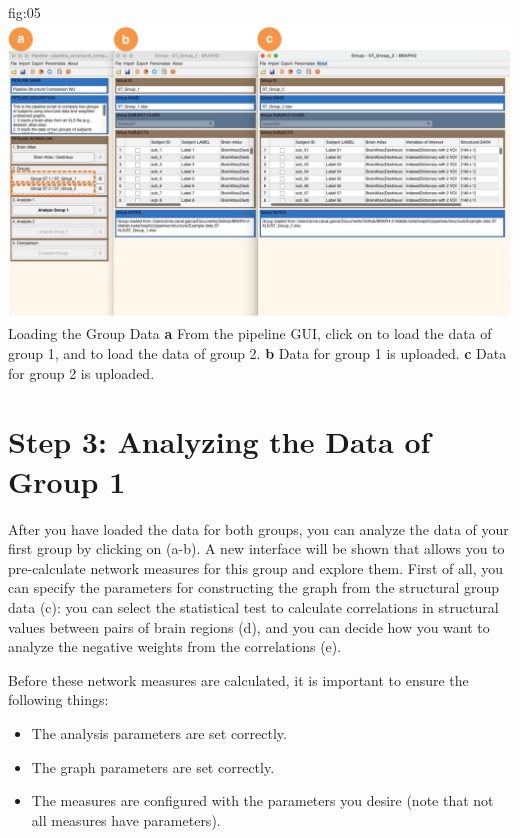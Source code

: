 \documentclass[justified]{tufte-handout}
\begin{document}
	{fig:05}
	{\includegraphics{fig05.jpg}}
	{Loading the Group Data}
	{
	{\bf a} From the pipeline GUI, click on  to load the data of group 1, and  to load the data of group 2.
	{\bf b} Data for group 1 is uploaded. {\bf c} Data for group 2 is uploaded.
	}


\section{Step 3: Analyzing the Data of Group 1}
 
After you have loaded the data for both groups, you can analyze the data of your first group by clicking on  (a-b). A new interface will be shown that allows you to pre-calculate network measures for this group and explore them. First of all, you can specify the parameters for constructing the graph from the structural group data (c): you can select the statistical test to calculate correlations in structural values between pairs of brain regions (d), and you can decide how you want to analyze the negative weights from the correlations (e). 

Before these network measures are calculated, it is important to ensure the following things: 
\begin{itemize}

\item The analysis parameters are set correctly.

\item The graph parameters are set correctly.

\item The measures are configured with the parameters you desire (note that not all measures have parameters).

\end{itemize}
\end{document}

